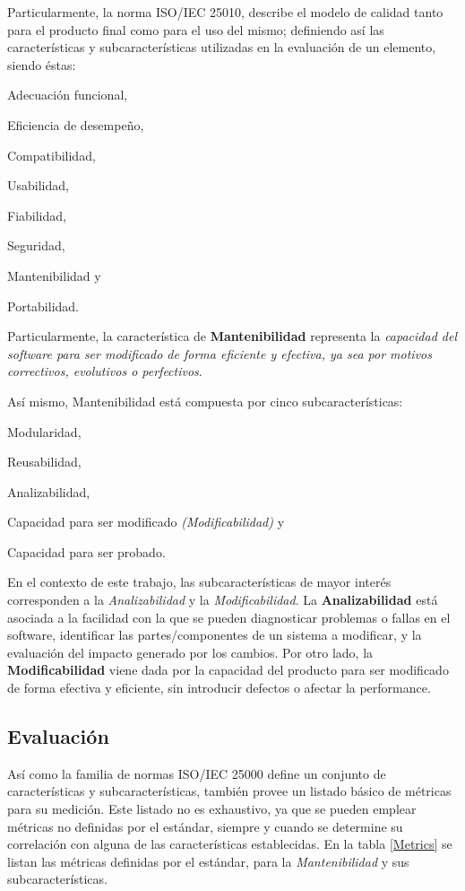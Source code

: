 Particularmente, la norma ISO/IEC 25010, describe el modelo de calidad tanto para el producto
final como para el uso del mismo; definiendo así las características y subcaracterísticas
utilizadas en la evaluación de un elemento, siendo éstas:
\begin{inparaenum}[(1)]
    \item Adecuación funcional,
    \item Eficiencia de desempeño,
    \item Compatibilidad,
    \item Usabilidad,
    \item Fiabilidad,
    \item Seguridad,
    \item Mantenibilidad y
    \item Portabilidad.
\end{inparaenum}
Particularmente, la característica de \textbf{Mantenibilidad} representa la \textit{capacidad del
software para ser modificado de forma eficiente y efectiva, ya sea por motivos correctivos,
evolutivos o perfectivos}.

Así mismo, Mantenibilidad está compuesta por cinco subcaracterísticas:
\begin{inparaenum}[(a)]
    \item Modularidad,
    \item Reusabilidad,
    \item Analizabilidad,
    \item Capacidad para ser modificado \textit{(Modificabilidad)} y
    \item Capacidad para ser probado.
\end{inparaenum}
En el contexto de este trabajo, las subcaracterísticas de mayor interés corresponden
a la \textit{Analizabilidad} y la \textit{Modificabilidad}.
La \textbf{Analizabilidad} está asociada a la facilidad con la que se pueden diagnosticar problemas
o fallas en el software, identificar las partes/componentes de un sistema a modificar, y la
evaluación del impacto generado por los cambios.
Por otro lado, la \textbf{Modificabilidad} viene dada por la capacidad del producto para ser
modificado de forma efectiva y eficiente, sin introducir defectos o afectar la performance.

\subsection{Evaluación}

Así como la familia de normas ISO/IEC 25000 define un conjunto de características y
subcaracterísticas, también provee un listado básico de métricas para su medición.
Este listado no es exhaustivo, ya que se pueden emplear métricas no definidas por el
estándar, siempre y cuando se determine su correlación con alguna de las características
establecidas.
En la tabla \ref{Metrics} se listan las métricas definidas por el estándar, para la \textit{Mantenibilidad}
y sus subcaracterísticas.


